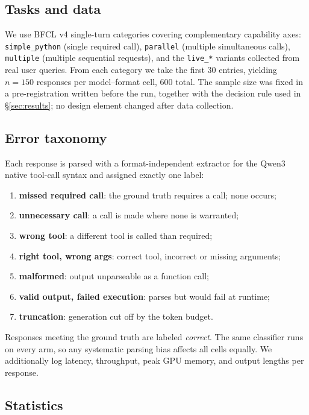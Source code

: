 \documentclass{article}
\begin{document}
\subsection{Tasks and data}

We use BFCL v4 single-turn categories covering complementary capability
axes: \texttt{simple\_python} (single required call), \texttt{parallel}
(multiple simultaneous calls), \texttt{multiple} (multiple sequential
requests), and the \texttt{live\_*} variants collected from real user
queries. From each category we take the first 30 entries, yielding $n=150$
responses per model--format cell, 600 total. The sample size was fixed in a
pre-registration written before the run, together with the decision rule
used in \S\ref{sec:results}; no design element changed after data collection.

\subsection{Error taxonomy}

Each response is parsed with a format-independent extractor for the Qwen3
native tool-call syntax and assigned exactly one label:

\begin{enumerate}
  \item \textbf{missed required call}: the ground truth requires a call; none occurs;
  \item \textbf{unnecessary call}: a call is made where none is warranted;
  \item \textbf{wrong tool}: a different tool is called than required;
  \item \textbf{right tool, wrong args}: correct tool, incorrect or missing arguments;
  \item \textbf{malformed}: output unparseable as a function call;
  \item \textbf{valid output, failed execution}: parses but would fail at runtime;
  \item \textbf{truncation}: generation cut off by the token budget.
\end{enumerate}

Responses meeting the ground truth are labeled \emph{correct}. The same
classifier runs on every arm, so any systematic parsing bias affects all
cells equally. We additionally log latency, throughput, peak GPU memory, and
output lengths per response.

\subsection{Statistics}
\end{document}
